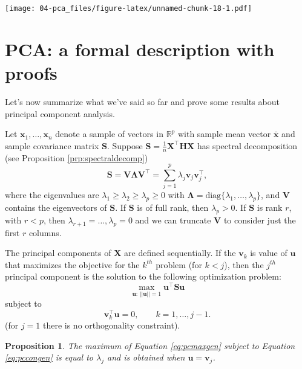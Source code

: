 \documentclass[
]{book}
\newtheorem{proposition}{Proposition}[chapter]
\theoremstyle{definition}
\theoremstyle{definition}
\theoremstyle{definition}
\theoremstyle{definition}
\theoremstyle{remark}
\begin{document}
\texttt{[image: 04-pca\_files/figure-latex/unnamed-chunk-18-1.pdf]}

\hypertarget{pca-a-formal-description-with-proofs}{%
\section{PCA: a formal description with proofs}\label{pca-a-formal-description-with-proofs}}

Let's now summarize what we've said so far and prove some results about principal component analysis.

Let \(\mathbf x_1, \ldots , \mathbf x_n\) denote a sample of vectors in \(\mathbb{R}^p\) with sample mean vector \(\bar{\mathbf x}\) and sample covariance matrix \(\mathbf S\). Suppose \(\mathbf S=\frac{1}{n}\mathbf X^\top \mathbf H\mathbf X\) has spectral decomposition (see Proposition \ref{prp:spectraldecomp})
\begin{equation}
\mathbf S=\mathbf V\boldsymbol \Lambda\mathbf V^\top = \sum_{j=1}^p  \lambda_j \mathbf v_j \mathbf v_j^\top,
\label{eq:pcaspect}
\end{equation}
where the eigenvalues are \(\lambda_1 \geq \lambda_2 \geq \lambda_p \geq 0\) with \(\boldsymbol \Lambda=\text{diag}\{\lambda_1, \ldots, \lambda_p\}\), and \(\mathbf V\) contains the eigenvectors of \(\mathbf S\). If \(\mathbf S\) is of full rank, then \(\lambda_p>0\). If \(\mathbf S\) is rank \(r\), with \(r<p\), then \(\lambda_{r+1}=\ldots, \lambda_p=0\) and we can truncate \(\mathbf V\) to consider just the first \(r\) columns.

The principal components of \(\mathbf X\) are defined sequentially. If the \(\mathbf v_k\) is value of \(\mathbf u\) that maximizes the objective for the \(k^{th}\) problem (for \(k<j\)), then the \(j^{th}\) principal component is the solution to the following optimization problem:
\begin{equation}
\max_{\mathbf u: \, \vert \vert \mathbf u\vert \vert =1}\mathbf u^\top \mathbf S\mathbf u
\label{eq:pcmaxgen}
\end{equation}
subject to
\begin{equation}
\mathbf v_k^\top \mathbf u=0, \qquad k=1, \ldots , j-1.
\label{eq:pccongen}
\end{equation}
(for \(j=1\) there is no orthogonality constraint).

\begin{proposition}
\protect\hypertarget{prp:pca1}{}{\label{prp:pca1} }The maximum of Equation \eqref{eq:pcmaxgen}
subject to Equation \eqref{eq:pccongen} is equal to \(\lambda_j\) and is obtained when \(\mathbf u=\mathbf v_j\).
\end{proposition}
\end{document}
